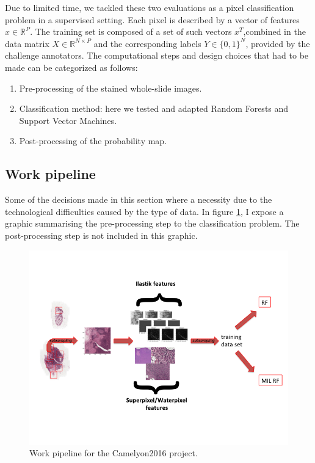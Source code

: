 \documentclass[a4paper,10pt]{article}
\begin{document}
Due to limited time, we tackled these two evaluations as a pixel classification problem in a supervised setting. Each pixel is described by a vector of features $x \in \mathbb{R}^P$. The training set is composed of a set of such vectors $x^T$,combined in the data matrix $X \in \mathbb{R}^{N \times P}$ and the corresponding labels $Y \in \{0,1\}^N$, provided by the challenge annotators. 
The computational steps and design choices that had to be made can be categorized as follows: 
\begin{enumerate}
	\item Pre-processing of the stained whole-slide images.
         \item Classification method: here we tested and adapted
           Random Forests and Support Vector Machines. 
         \item Post-processing of the probability map.
\end{enumerate}

\subsection{Work pipeline}
Some of the decisions made in this section where a necessity due to the technological difficulties caused by the type of data. In figure \ref{PipelineCam}, I expose a graphic summarising the pre-processing step to the classification problem. The post-processing step is not included in this graphic.

\begin{figure}[!ht]
\centering
\includegraphics[width=\textwidth]{workflow.png}
\caption{Work pipeline for the Camelyon2016 project.}
\label{PipelineCam}
\end{figure}
\end{document}
